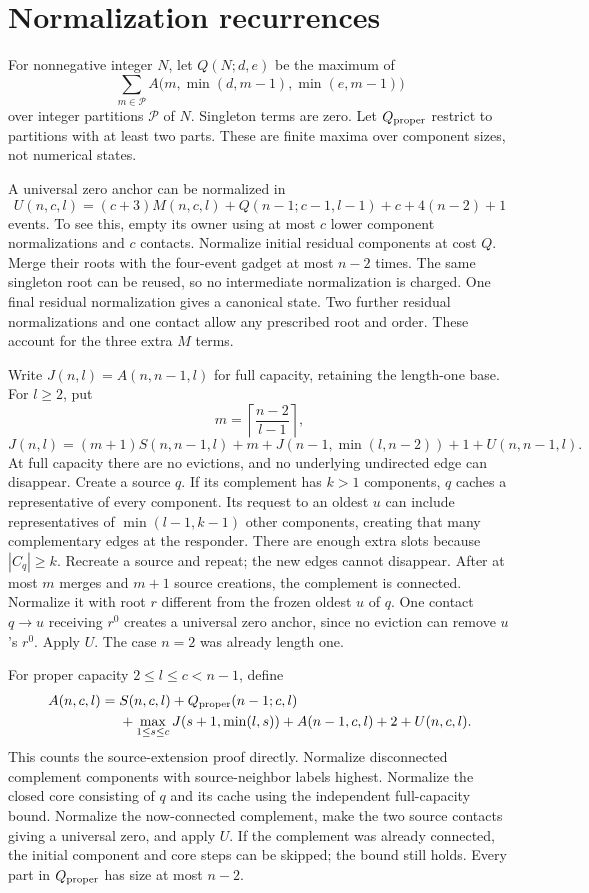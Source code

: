 \documentclass[11pt]{article}
\begin{document}
\section{Normalization recurrences}
For nonnegative integer $N$, let $Q(N;d,e)$ be the maximum of
\[
 \sum_{m\in\mathcal P}A\bigl(m,\min(d,m-1),\min(e,m-1)\bigr)
\]
over integer partitions $\mathcal P$ of $N$. Singleton terms are zero.
Let $Q_{\rm proper}$ restrict to partitions with at least two parts.
These are finite maxima over component sizes, not numerical states.

A universal zero anchor can be normalized in
\[
 U(n,c,l)=(c+3)M(n,c,l)+Q(n-1;c-1,l-1)+c+4(n-2)+1
\]
events. To see this, empty its owner using at most $c$ lower component
normalizations and $c$ contacts. Normalize initial residual components at
cost $Q$. Merge their roots with the four-event gadget at most $n-2$ times.
The same singleton root can be reused, so no intermediate normalization
is charged. One final residual normalization gives a canonical state.
Two further residual normalizations and one contact allow any prescribed
root and order. These account for the three extra $M$ terms.

Write $J(n,l)=A(n,n-1,l)$ for full capacity, retaining the length-one base.
For $l\ge2$, put
\[
 m=\left\lceil\frac{n-2}{l-1}\right\rceil,
\]
\[
 J(n,l)=(m+1)S(n,n-1,l)+m
       +J(n-1,\min(l,n-2))+1+U(n,n-1,l).
\]
At full capacity there are no evictions, and no underlying undirected edge
can disappear. Create a source $q$. If its complement has $k>1$ components,
$q$ caches a representative of every component. Its request to an oldest
$u$ can include representatives of $\min(l-1,k-1)$ other components,
creating that many complementary edges at the responder. There are enough
extra slots because $|C_q|\ge k$. Recreate a source and repeat; the new
edges cannot disappear. After at most $m$ merges and $m+1$ source creations,
the complement is connected. Normalize it with root $r$ different from
the frozen oldest $u$ of $q$. One contact $q\to u$ receiving $r^0$ creates
a universal zero anchor, since no eviction can remove $u$'s $r^0$. Apply $U$.
The case $n=2$ was already length one.

For proper capacity $2\le l\le c<n-1$, define
\begin{align*}
 A(n,c,l)={}&S(n,c,l)+Q_{\rm proper}(n-1;c,l)\\
 &+\max_{1\le s\le c}J(s+1,\min(l,s))
 +A(n-1,c,l)+2+U(n,c,l).
\end{align*}
This counts the source-extension proof directly. Normalize disconnected
complement components with source-neighbor labels highest. Normalize the
closed core consisting of $q$ and its cache using the independent
full-capacity bound. Normalize the now-connected complement, make the two
source contacts giving a universal zero, and apply $U$. If the complement
was already connected, the initial component and core steps can be skipped;
the bound still holds. Every part in $Q_{\rm proper}$ has size at most $n-2$.
\end{document}
